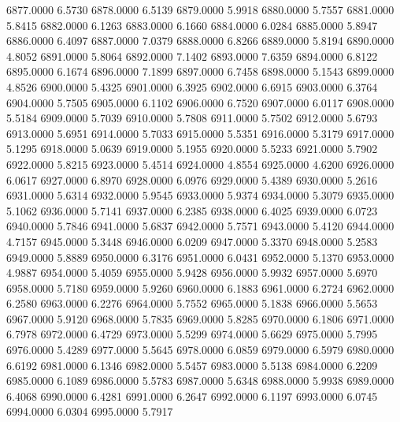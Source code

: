 6877.0000      6.5730
6878.0000      6.5139
6879.0000      5.9918
6880.0000      5.7557
6881.0000      5.8415
6882.0000      6.1263
6883.0000      6.1660
6884.0000      6.0284
6885.0000      5.8947
6886.0000      6.4097
6887.0000      7.0379
6888.0000      6.8266
6889.0000      5.8194
6890.0000      4.8052
6891.0000      5.8064
6892.0000      7.1402
6893.0000      7.6359
6894.0000      6.8122
6895.0000      6.1674
6896.0000      7.1899
6897.0000      6.7458
6898.0000      5.1543
6899.0000      4.8526
6900.0000      5.4325
6901.0000      6.3925
6902.0000      6.6915
6903.0000      6.3764
6904.0000      5.7505
6905.0000      6.1102
6906.0000      6.7520
6907.0000      6.0117
6908.0000      5.5184
6909.0000      5.7039
6910.0000      5.7808
6911.0000      5.7502
6912.0000      5.6793
6913.0000      5.6951
6914.0000      5.7033
6915.0000      5.5351
6916.0000      5.3179
6917.0000      5.1295
6918.0000      5.0639
6919.0000      5.1955
6920.0000      5.5233
6921.0000      5.7902
6922.0000      5.8215
6923.0000      5.4514
6924.0000      4.8554
6925.0000      4.6200
6926.0000      6.0617
6927.0000      6.8970
6928.0000      6.0976
6929.0000      5.4389
6930.0000      5.2616
6931.0000      5.6314
6932.0000      5.9545
6933.0000      5.9374
6934.0000      5.3079
6935.0000      5.1062
6936.0000      5.7141
6937.0000      6.2385
6938.0000      6.4025
6939.0000      6.0723
6940.0000      5.7846
6941.0000      5.6837
6942.0000      5.7571
6943.0000      5.4120
6944.0000      4.7157
6945.0000      5.3448
6946.0000      6.0209
6947.0000      5.3370
6948.0000      5.2583
6949.0000      5.8889
6950.0000      6.3176
6951.0000      6.0431
6952.0000      5.1370
6953.0000      4.9887
6954.0000      5.4059
6955.0000      5.9428
6956.0000      5.9932
6957.0000      5.6970
6958.0000      5.7180
6959.0000      5.9260
6960.0000      6.1883
6961.0000      6.2724
6962.0000      6.2580
6963.0000      6.2276
6964.0000      5.7552
6965.0000      5.1838
6966.0000      5.5653
6967.0000      5.9120
6968.0000      5.7835
6969.0000      5.8285
6970.0000      6.1806
6971.0000      6.7978
6972.0000      6.4729
6973.0000      5.5299
6974.0000      5.6629
6975.0000      5.7995
6976.0000      5.4289
6977.0000      5.5645
6978.0000      6.0859
6979.0000      6.5979
6980.0000      6.6192
6981.0000      6.1346
6982.0000      5.5457
6983.0000      5.5138
6984.0000      6.2209
6985.0000      6.1089
6986.0000      5.5783
6987.0000      5.6348
6988.0000      5.9938
6989.0000      6.4068
6990.0000      6.4281
6991.0000      6.2647
6992.0000      6.1197
6993.0000      6.0745
6994.0000      6.0304
6995.0000      5.7917
